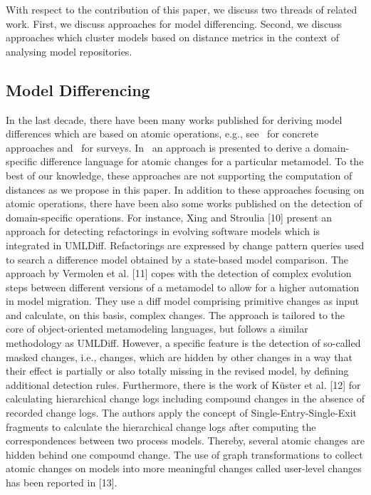 With respect to the contribution of this paper, we discuss two threads of related work. First, we discuss approaches for model differencing. Second, we discuss approaches which cluster models based on distance metrics in the context of analysing model repositories.

\subsection{Model Differencing} In the last decade, there have been many works published for deriving model differences which are based on atomic operations, e.g., see~\cite{} for concrete approaches and~\cite{} for surveys. In~\cite{} an approach is presented to derive a domain-specific difference language for atomic changes for a particular metamodel.
 To the best of our knowledge, these approaches are not supporting the computation of distances as we propose in this paper.
In addition to these approaches focusing on atomic operations, there have been also some works published on the detection of domain-specific operations. For instance, Xing and Stroulia [10] present an approach for detecting refactorings in evolving software models which is integrated in UMLDiff. Refactorings
are expressed by change pattern queries used to search a
difference model obtained by a state-based model comparison.
The approach by Vermolen et al. [11] copes with the detection
of complex evolution steps between different versions of a
metamodel to allow for a higher automation in model
migration. They use a diff model comprising primitive changes
as input and calculate, on this basis, complex changes. The
approach is tailored to the core of object-oriented
metamodeling languages, but follows a similar methodology as
UMLDiff. However, a specific feature is the detection of so-called
masked changes, i.e., changes, which are hidden by other
changes in a way that their effect is partially or also totally
missing in the revised model, by defining additional detection
rules. Furthermore, there is the work of Küster et al. [12] for
calculating hierarchical change logs including compound
changes in the absence of recorded change logs. The authors
apply the concept of Single-Entry-Single-Exit fragments to
calculate the hierarchical change logs after computing the
correspondences between two process models. Thereby,
several atomic changes are hidden behind one compound
change. The use of graph transformations to collect atomic
changes on models into more meaningful changes called user-level
changes has been reported in [13].

